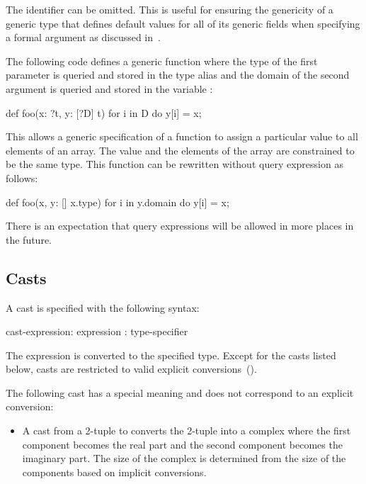 The identifier can be omitted.  This is useful for ensuring the
genericity of a generic type that defines default values for all of
its generic fields when specifying a formal argument as discussed
in~.

\begin{example}
The following code defines a generic function where the type of the
first parameter is queried and stored in the type alias  and
the domain of the second argument is queried and stored in the
variable :
\begin{chapel}
def foo(x: ?t, y: [?D] t) {
  for i in D do
    y[i] = x;
}
\end{chapel}
This allows a generic specification of a function to assign a
particular value to all elements of an array.  The value and the
elements of the array are constrained to be the same type.  This
function can be rewritten without query expression as follows:
\begin{chapel}
def foo(x, y: [] x.type) {
  for i in y.domain do
    y[i] = x;
}
\end{chapel}
\end{example}

There is an expectation that query expressions will be allowed in more
places in the future.

\subsection{Casts}
\label{Casts}

A cast is specified with the following syntax:
\begin{syntax}
cast-expression:
  expression : type-specifier
\end{syntax}
The expression is converted to the specified type.  Except for the
casts listed below, casts are restricted to valid explicit
conversions~().

The following cast has a special meaning and does not correspond to an
explicit conversion:
\begin{itemize}
\item {}
  A cast from a 2-tuple to  converts the 2-tuple into a
  complex where the first component becomes the real part and the
  second component becomes the imaginary part.  The size of the
  complex is determined from the size of the components based on
  implicit conversions.
\end{itemize}

